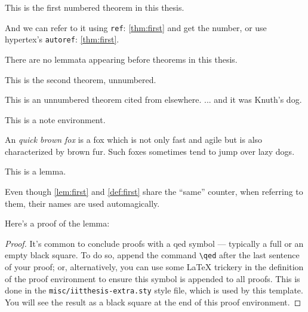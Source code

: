 \begin{theorem}
\label{thm:first}
This is the first numbered theorem in this thesis.
\end{theorem}

And we can refer to it using \texttt{ref}: \ref{thm:first} and get the number, or use hypertex's \texttt{autoref}: \autoref{thm:first}.

\begin{corollary}
\label{cor:first}
There are no lemmata appearing before theorems in this thesis.
\end{corollary}

\begin{theorem*}
This is the second theorem, unnumbered.
\end{theorem*}

\begin{theorem*}
This is an unnumbered theorem cited from elsewhere.  ... and it was Knuth's dog.
\end{theorem*}

\begin{note}
This is a note environment.  
\end{note}

\begin{definition}
\label{def:first}
An \emph{quick brown fox} is a fox which is not only fast and agile but is also characterized by brown fur. Such foxes sometimes tend to jump over lazy dogs.
\end{definition}

\begin{lemma}
\label{lem:first}
This is a lemma. 
\end{lemma}

Even though \autoref{lem:first} and \autoref{def:first} share the ``same'' counter, when referring to them, their names are used automagically.

Here's a proof of the lemma:
\begin{proof}%
\lipsum[2]
	It's common to conclude proofs with a \gls{qed} symbol --- typically a full or an empty black square. To do so, append the command \verb|\qed| after the last sentence of your proof; or, alternatively, you can use some \LaTeX{} trickery in the definition of the proof environment to ensure this symbol is appended to all proofs. This is done in the \texttt{misc/iitthesis-extra.sty} style file, which is used by this template. You will see the result as a black square at the end of this proof environment.
\end{proof}

